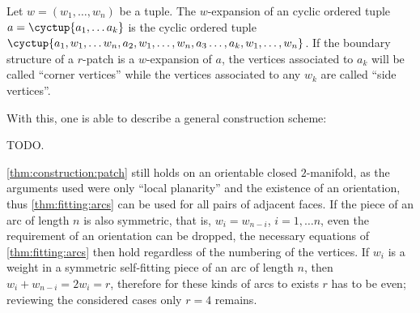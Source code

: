 \begin{definition}
  Let $w = (w_1, \dots, w_n)$ be a tuple. The $w$-expansion of an cyclic ordered tuple $a = \cyctup{a_1, \dots a_k}$ is the cyclic ordered tuple $\cyctup{a_1, w_1, \dots w_n, a_2, w_1, \dots, w_n, a_3 \dots, a_k, w_1, \dots, w_n}$. If the boundary structure of a $r$-patch is a $w$-expansion of $a$, the vertices associated to $a_k$ will be called ``corner vertices'' while the vertices associated to any $w_k$ are called ``side vertices''.
\end{definition}

With this, one is able to describe a general construction scheme:

\begin{construction}\label{thm:construction:patch}
TODO.
\end{construction}

\begin{remark}
  \autoref{thm:construction:patch} still holds on an orientable closed $2$-manifold, as the arguments used were only ``local planarity'' and the existence of an orientation, thus \autoref{thm:fitting:arcs} can be used for all pairs of adjacent faces. If the piece of an arc of length $n$ is also symmetric, that is, $w_i = w_{n-i}$, $i = 1, \dots n$, even the requirement of an orientation can be dropped, the necessary equations of \autoref{thm:fitting:arcs} then hold regardless of the numbering of the vertices. If $w_i$ is a weight in a symmetric self-fitting piece of an arc of length $n$, then $w_i + w_{n-i} = 2 w_i = r$, therefore for these kinds of arcs to exists $r$ has to be even; reviewing the considered cases only $r = 4$ remains.
\end{remark}

